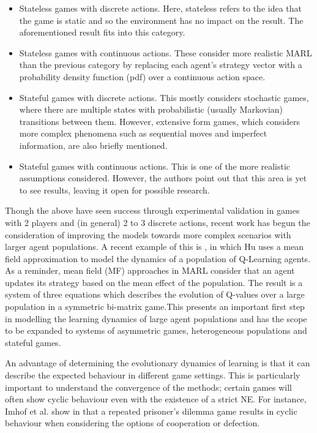 \documentclass[.../main.tex]{subfiles}
\begin{document}
\begin{itemize}
    \item Stateless games with discrete actions. Here, stateless refers to the idea that the game is
    static and so the environment has no impact on the result. The aforementioned result 
    \cite{Tuyls2006AnGames} fits into this category.
    \item Stateless games with continuous actions. These consider more realistic MARL than the
    previous category by replacing each agent's strategy vector with a probability density function 
    (pdf) over a continuous action space.
    \item Stateful games with discrete actions. This mostly considers stochastic games, where there
    are multiple states with probabilistic (usually Markovian) transitions between them. However,
    extensive form games, which considers more complex phenomena such as sequential moves and
    imperfect information, are also briefly mentioned.
    \item Stateful games with continuous actions. This is one of the more realistic assumptions
    considered. However, the authors point out that this area is yet to see results, leaving it open
    for possible research.
\end{itemize}

Though the above have seen success through experimental validation in games with 2 players and (in
general) 2 to 3 discrete actions, recent work has begun the consideration of improving the models
towards more complex scenarios with larger agent populations. A recent example of this is 
\cite{Hu2019}, in which Hu uses a mean field approximation to model the dynamics of a population of
Q-Learning agents. As a reminder, mean field (MF) approaches in MARL consider that an agent updates
its strategy based on the mean effect of the population. The result is a system of three equations
which describes the evolution of Q-values over a large population in a symmetric bi-matrix game.This
presents an important first step in modelling the learning dynamics of large agent populations and
has the scope to be expanded to systems of asymmetric games, heterogeneous populations and stateful
games.

An advantage of determining the evolutionary dynamics of learning is that it can describe the
expected behaviour in different game settings. This is particularly important to understand the
convergence of the methods; certain games will often show cyclic behaviour even with the existence
of a strict NE. For instance, Imhof et al. show in \cite{Imhof2005} that a repeated prisoner's
dilemma game results in cyclic behaviour when considering the options of cooperation or defection.
\end{document}
